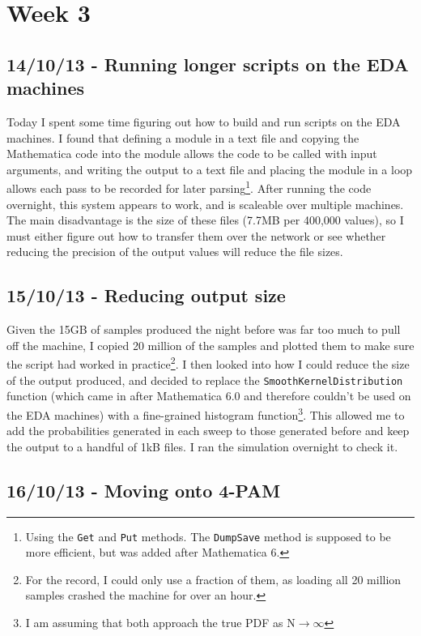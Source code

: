 \section{Week 3}

\subsection{14/10/13 - Running longer scripts on the EDA machines}

Today I spent some time figuring out how to build and run scripts on the
EDA machines. I found that defining a module in a text file and copying
the Mathematica code into the module allows the code to be called with
input arguments, and writing the output to a text file and placing the
module in a loop allows each pass to be recorded for later
parsing\footnote{Using the \texttt{Get} and \texttt{Put} methods. The
  \texttt{DumpSave} method is supposed to be more efficient, but was
  added after Mathematica 6.}. After running the code overnight, this
system appears to work, and is scaleable over multiple machines. The
main disadvantage is the size of these files (7.7MB per 400,000 values),
so I must either figure out how to transfer them over the network or see
whether reducing the precision of the output values will reduce the file
sizes.

\subsection{15/10/13 - Reducing output size}

Given the 15GB of samples produced the night before was far too much to
pull off the machine, I copied 20 million of the samples and plotted
them to make sure the script had worked in practice\footnote{For the
  record, I could only use a fraction of them, as loading all 20 million
  samples crashed the machine for over an hour.}. I then looked into how
I could reduce the size of the output produced, and decided to replace
the \texttt{SmoothKernelDistribution} function (which came in after
Mathematica 6.0 and therefore couldn't be used on the EDA machines) with
a fine-grained histogram function\footnote{I am assuming that both
  approach the true PDF as $\text{N} \! \rightarrow \! \infty$}. This
allowed me to add the probabilities generated in each sweep to those
generated before and keep the output to a handful of 1kB files. I ran
the simulation overnight to check it.

\subsection{16/10/13 - Moving onto 4-PAM}

